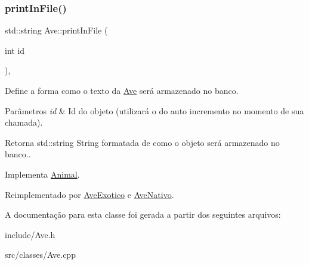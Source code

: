 \subsubsection{\texorpdfstring{print\+In\+File()}{printInFile()}}
{\footnotesize\ttfamily std\+::string Ave\+::print\+In\+File (\begin{DoxyParamCaption}\item[{int}]{id }\end{DoxyParamCaption})\hspace{0.3cm}{\ttfamily [protected]}, {\ttfamily [virtual]}}



Define a forma como o texto da \hyperlink{classAve}{Ave} será armazenado no banco. 


\begin{DoxyParams}{Parâmetros}
{\em id} & Id do objeto (utilizará o do auto incremento no momento de sua chamada). \\
\hline
\end{DoxyParams}
\begin{DoxyReturn}{Retorna}
std\+::string String formatada de como o objeto será armazenado no banco.. 
\end{DoxyReturn}


Implementa \hyperlink{classAnimal_ac75406040726a6339932d70164cc7242}{Animal}.



Reimplementado por \hyperlink{classAveExotico_a4ba81def12131f047b3800e5f10a983b}{Ave\+Exotico} e \hyperlink{classAveNativo_ab95679ed20354b2183706db24899d316}{Ave\+Nativo}.



A documentação para esta classe foi gerada a partir dos seguintes arquivos\+:\begin{DoxyCompactItemize}
\item 
include/Ave.\+h\item 
src/classes/Ave.\+cpp\end{DoxyCompactItemize}
